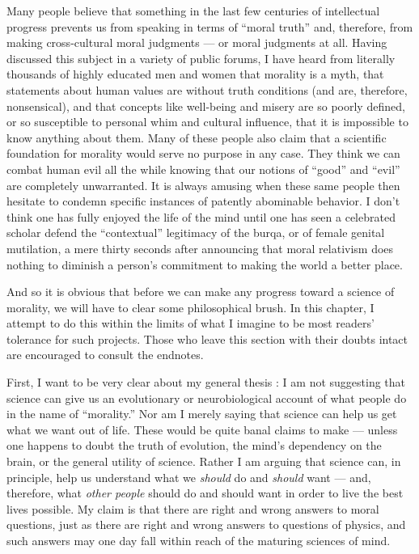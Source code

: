 \documentclass[a4paper,14pt]{extbook}
\begin{document}
Many people believe that something in the last few centuries of intellectual progress prevents us from speaking in terms of ``moral truth'' and, therefore, from making cross-cultural moral judgments --- or moral judgments at all.
Having discussed this subject in a variety of public forums, I have heard from literally thousands of highly educated men and women that morality is a myth, that statements about human values are without truth conditions (and are, therefore, nonsensical), and that concepts like well-being and misery are so poorly defined, or so susceptible to personal whim and cultural influence, that it is impossible to know anything about them.
Many of these people also claim that a scientific foundation for morality would serve no purpose in any case.
They think we can combat human evil all the while knowing that our notions of ``good'' and ``evil'' are completely unwarranted.
It is always amusing when these same people then hesitate to condemn specific instances of patently abominable behavior.
I don't think one has fully enjoyed the life of the mind until one has seen a celebrated scholar defend the ``contextual'' legitimacy of the burqa, or of female genital mutilation, a mere thirty seconds after announcing that moral relativism does nothing to diminish a person's commitment to making the world a better place.

And so it is obvious that before we can make any progress toward a science of morality, we will have to clear some philosophical brush.
In this chapter, I attempt to do this within the limits of what I imagine to be most readers' tolerance for such projects.
Those who leave this section with their doubts intact are encouraged to consult the endnotes.

First, I want to be very clear about my general thesis :
I am not suggesting that science can give us an evolutionary or neurobiological account of what people do in the name of ``morality.''
Nor am I merely saying that science can help us get what we want out of life.
These would be quite banal claims to make --- unless one happens to doubt the truth of evolution, the mind's dependency on the brain, or the general utility of science.
Rather I am arguing that science can, in principle, help us understand what we \textit{should} do and \textit{should} want --- and, therefore, what \textit{other people} should do and should want in order to live the best lives possible.
My claim is that there are right and wrong answers to moral questions, just as there are right and wrong answers to questions of physics, and such answers may one day fall within reach of the maturing sciences of mind.
\end{document}
